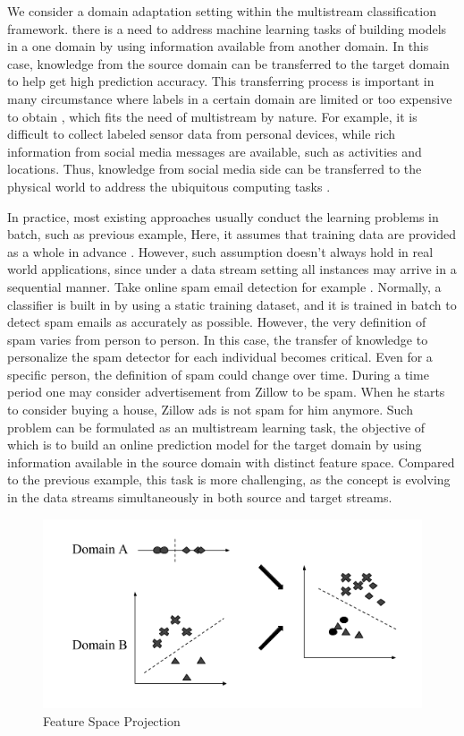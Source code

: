 We consider a domain adaptation setting within the multistream classification framework. there is a need to address machine learning tasks of building 
models in a one domain by using information available from another domain. In
this case, knowledge from the source domain can be transferred to the target domain to
help get high prediction accuracy. This transferring process is important in many 
circumstance where labels in a certain domain are limited or too expensive to obtain \cite{arnold2007comparative, hoi2014libol}, which fits the need of multistream by nature.
For example, it is difficult to collect labeled sensor
data from personal devices, while rich information from social media messages are available, such as 
activities and locations. Thus, knowledge from social media side can be transferred to
the physical world to address the ubiquitous computing tasks \cite{wei2016instilling}. 

In practice, most existing approaches usually conduct the learning problems in batch, such as previous example, Here, it 
assumes that training data are provided as a whole in advance \cite{pan2010survey}. However, such assumption 
doesn't always hold in real world applications, since under a data stream setting 
all instances may arrive in a sequential manner. Take online spam email detection for example \cite{chen2015opinion}. 
Normally, a classifier is built in by using a static training dataset, and it is trained in batch to
detect spam emails as accurately as possible. However, the very definition of spam varies from 
person to person. In this case, the transfer of knowledge to personalize the spam detector for each 
individual becomes critical. Even for a specific person, the definition of spam could change over time. During a 
time period one may consider advertisement from Zillow to be spam. When he starts to consider buying a house,
Zillow ads is not spam for him anymore. Such problem can be formulated as an multistream learning task, the 
objective of which is to build an online prediction model for the target domain by using information 
available in the source domain with distinct feature space. Compared to the previous example, this task 
is more challenging, as the concept is evolving in the data streams simultaneously in both source and target streams.

\begin{figure}[t]
\centering
\includegraphics[width=1.0\columnwidth]{Figures/feature_projection.png}
\caption{Feature Space Projection}
\label{fig:featureprojection}
\end{figure}

